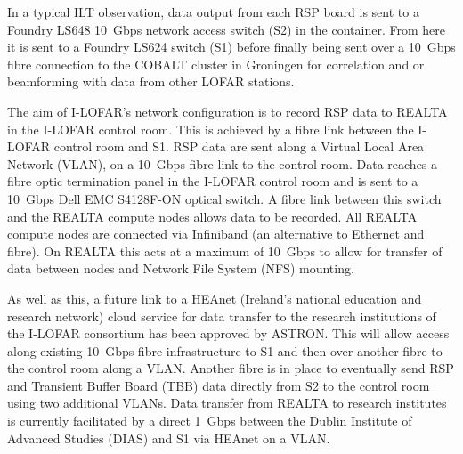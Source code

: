 In a typical ILT observation, data output from each RSP board is sent to a Foundry LS648 10~Gbps network access switch (S2) in the container. From here it is sent to a Foundry LS624 switch (S1) before finally being sent over a 10~Gbps fibre connection to the COBALT cluster in Groningen for correlation and or beamforming with data from other LOFAR stations.

The aim of I-LOFAR's network configuration is to record RSP data to REALTA in the I-LOFAR control room. This is achieved by a fibre link between the I-LOFAR control room and S1. RSP data are sent along a Virtual Local Area Network (VLAN), on a 10~Gbps fibre link to the control room. Data reaches a fibre optic termination panel in the I-LOFAR control room and is sent to a 10~Gbps Dell EMC S4128F-ON optical switch. A fibre link between this switch and the REALTA compute nodes allows data to be recorded. All REALTA compute nodes are connected via Infiniband (an alternative to Ethernet and fibre). On REALTA this acts at a maximum of 10~Gbps to allow for transfer of data between nodes and Network File System (NFS) mounting.

As well as this, a future link to a HEAnet (Ireland’s national education and research network) cloud service for data transfer to the research institutions of the I-LOFAR consortium has been approved by ASTRON. This will allow access along existing 10~Gbps fibre infrastructure to S1 and then over another fibre to the control room along a VLAN. Another fibre is in place to eventually send RSP and Transient Buffer Board (TBB) data directly from S2 to the control room using two additional VLANs.
Data transfer from REALTA to research institutes is currently facilitated by a direct 1~Gbps between the Dublin Institute of Advanced Studies (DIAS) and S1 via HEAnet on a VLAN.

